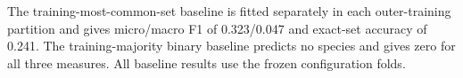 \documentclass[11pt,a4paper]{article}
\begin{document}
The training-most-common-set baseline is fitted separately in each outer-training partition and gives micro/macro F1 of 0.323/0.047 and exact-set accuracy of 0.241. The training-majority binary baseline predicts no species and gives zero for all three measures. All baseline results use the frozen configuration folds.





\end{document}
